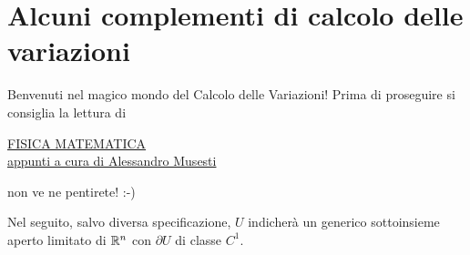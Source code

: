 

\chapter{Alcuni complementi di calcolo delle variazioni}\label{Alcuni complementi di calcolo delle variazioni}
Benvenuti nel magico mondo del Calcolo delle Variazioni! Prima di proseguire si consiglia la lettura di
\begin{center}
	\href{https://www.dmf.unicatt.it/~musesti/FM/}{FISICA MATEMATICA\\
		appunti a cura di Alessandro Musesti}
\end{center}
non ve ne pentirete! :-)

Nel seguito, salvo diversa specificazione, $U$ indicherà un generico sottoinsieme aperto limitato di $\mathbb{R}^n$ con $\partial U$ di classe $C^1$. 
